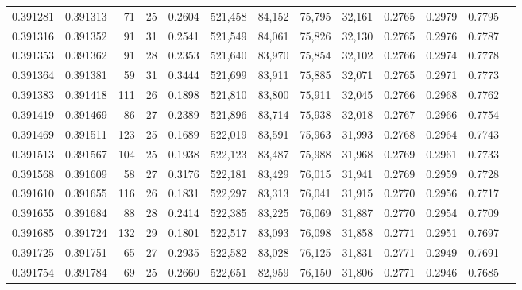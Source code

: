 \begin{tabular}{rrrrrrrrrrrrr}
0.391281 & 0.391313 &    71 &  25 &                                     0.2604 & 521,458 &  84,152 &  75,795 &  32,161 & 0.2765 & 0.2979 & 0.7795 \\
0.391316 & 0.391352 &    91 &  31 &                                     0.2541 & 521,549 &  84,061 &  75,826 &  32,130 & 0.2765 & 0.2976 & 0.7787 \\
0.391353 & 0.391362 &    91 &  28 &                                     0.2353 & 521,640 &  83,970 &  75,854 &  32,102 & 0.2766 & 0.2974 & 0.7778 \\
0.391364 & 0.391381 &    59 &  31 &                                     0.3444 & 521,699 &  83,911 &  75,885 &  32,071 & 0.2765 & 0.2971 & 0.7773 \\
0.391383 & 0.391418 &   111 &  26 &                                     0.1898 & 521,810 &  83,800 &  75,911 &  32,045 & 0.2766 & 0.2968 & 0.7762 \\
0.391419 & 0.391469 &    86 &  27 &                                     0.2389 & 521,896 &  83,714 &  75,938 &  32,018 & 0.2767 & 0.2966 & 0.7754 \\
0.391469 & 0.391511 &   123 &  25 &                                     0.1689 & 522,019 &  83,591 &  75,963 &  31,993 & 0.2768 & 0.2964 & 0.7743 \\
0.391513 & 0.391567 &   104 &  25 &                                     0.1938 & 522,123 &  83,487 &  75,988 &  31,968 & 0.2769 & 0.2961 & 0.7733 \\
0.391568 & 0.391609 &    58 &  27 &                                     0.3176 & 522,181 &  83,429 &  76,015 &  31,941 & 0.2769 & 0.2959 & 0.7728 \\
0.391610 & 0.391655 &   116 &  26 &                                     0.1831 & 522,297 &  83,313 &  76,041 &  31,915 & 0.2770 & 0.2956 & 0.7717 \\
0.391655 & 0.391684 &    88 &  28 &                                     0.2414 & 522,385 &  83,225 &  76,069 &  31,887 & 0.2770 & 0.2954 & 0.7709 \\
0.391685 & 0.391724 &   132 &  29 &                                     0.1801 & 522,517 &  83,093 &  76,098 &  31,858 & 0.2771 & 0.2951 & 0.7697 \\
0.391725 & 0.391751 &    65 &  27 &                                     0.2935 & 522,582 &  83,028 &  76,125 &  31,831 & 0.2771 & 0.2949 & 0.7691 \\
0.391754 & 0.391784 &    69 &  25 &                                     0.2660 & 522,651 &  82,959 &  76,150 &  31,806 & 0.2771 & 0.2946 & 0.7685 \\

\end{tabular}
